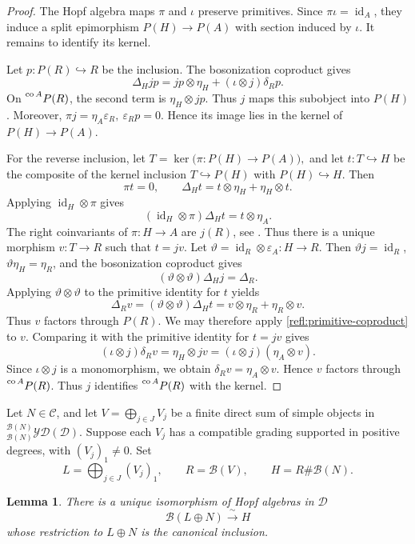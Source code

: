 \documentclass[11pt, a4paper]{article}
\numberwithin{equation}{section}
\newcommand{\C}{\mathcal C}
\newcommand{\D}{\mathcal D}
\newcommand{\B}{\mathcal B}
\newcommand{\YD}{\mathcal{YD}}
\DeclareMathOperator{\id}{id}
\DeclareMathOperator{\co}{co}
\newtheorem{lemma}[theorem]{Lemma}
\begin{document}
\begin{proof}
The Hopf algebra maps $\pi$ and $\iota$ preserve primitives.
Since $\pi\iota=\id_A$, they induce a split epimorphism
$P(H)\to P(A)$ with section induced by $\iota$.
It remains to identify its kernel.

Let $p:P(R)\hookrightarrow R$ be the inclusion.
The bosonization coproduct gives
\begin{equation}\label{refl:primitive-coproduct}
 \Delta_Hjp
 =jp\otimes\eta_H+(\iota\otimes j)\delta_Rp.
\end{equation}
On $\prescript{\co A}{}{P(R)}$, the second term is
$\eta_H\otimes jp$. Thus $j$ maps this subobject into $P(H)$.
Moreover,
$
 \pi j=\eta_A\varepsilon_R,
 \
 \varepsilon_Rp=0.
$
Hence its image lies in the kernel of $P(H)\to P(A)$.

For the reverse inclusion, let
$
 T=\ker\bigl(\pi:P(H)\longrightarrow P(A)\bigr),
$
and let $t:T\hookrightarrow H$ be the composite of the
kernel inclusion $T\hookrightarrow P(H)$ with
$P(H)\hookrightarrow H$.
Then
\[
 \pi t=0,
 \qquad
 \Delta_Ht=t\otimes\eta_H+\eta_H\otimes t.
\]
 {Applying} $  \id_H\otimes\pi   $  {gives}
\[
   (\id_H\otimes\pi)\Delta_Ht=t\otimes\eta_A.   
\]
The right coinvariants of $\pi:H\to A$ are $j(R)$, { 
see \cite[Corollary~3.9.3(1)]{rootsys}}.
Thus there is a unique morphism $v:T\to R$ such that $t=jv$.
 Let $\vartheta=\id_R\otimes\varepsilon_A:H\to R$.
Then $\vartheta j=\id_R$, $\vartheta\eta_H=\eta_R$, and
the bosonization coproduct gives
\[
 (\vartheta\otimes\vartheta)\Delta_Hj=\Delta_R.
\]
Applying $\vartheta\otimes\vartheta$ to the primitive
identity for $t$ yields
\[
 \Delta_Rv
 =(\vartheta\otimes\vartheta)\Delta_Ht
 =v\otimes\eta_R+\eta_R\otimes v.
\]
Thus $v$ factors through $P(R)$.
We may therefore apply \eqref{refl:primitive-coproduct}
to $v$. Comparing it with the primitive identity for
$t=jv$ gives
\[
 (\iota\otimes j)\delta_Rv
 =\eta_H\otimes jv
 =(\iota\otimes j)(\eta_A\otimes v).
\]
Since $\iota\otimes j$ is a monomorphism, we obtain
$\delta_Rv=\eta_A\otimes v$.
Hence $v$ factors through
$\prescript{\co A}{}{P(R)}$.
 {Thus} $  j   $  {identifies} $  \prescript{\co A}{}{P(R)}   $  {with} the kernel.

\end{proof}

Let $N\in\C$, and let
$V=\bigoplus_{j\in J}V_j$ be a finite direct sum of simple objects in
${}^{\B(N)}_{\B(N)}\YD(\D)$.  Suppose each $V_j$ has a compatible grading
supported in positive degrees, with $(V_j)_1\neq0$.  Set
\[
 L=\bigoplus_{j\in J}(V_j)_1,
 \qquad R=\B(V),\qquad H=R\#\B(N).
\]
\begin{lemma}\label{refl:reconstruction}
There is a unique isomorphism of Hopf algebras in $\D$
\[
 \B(L\oplus N)\xrightarrow{\ \sim\ }H
\]
whose restriction to $L\oplus N$ is the canonical inclusion.
\end{lemma}
\end{document}
